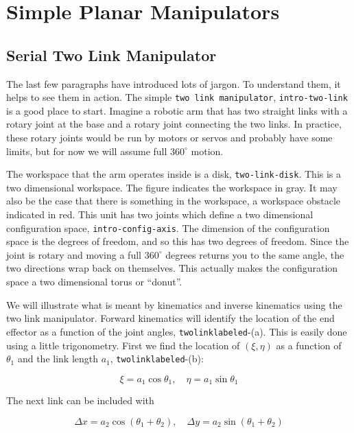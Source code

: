 \hypertarget{simple-planar-manipulators}{%
\section{Simple Planar Manipulators}\label{simple-planar-manipulators}}

\hypertarget{serial-two-link-manipulator}{%
\subsection{Serial Two Link
Manipulator}\label{serial-two-link-manipulator}}

The last few paragraphs have introduced lots of jargon. To understand
them, it helps to see them in action. The simple
\texttt{two\ link\ manipulator}, \texttt{intro-two-link} is a good place
to start. Imagine a robotic arm that has two straight links with a
rotary joint at the base and a rotary joint connecting the two links. In
practice, these rotary joints would be run by motors or servos and
probably have some limits, but for now we will assume full \(360^\circ\)
motion.

The workspace that the arm operates inside is a disk,
\texttt{two-link-disk}. This is a two dimensional workspace. The figure
indicates the workspace in gray. It may also be the case that there is
something in the workspace, a workspace obstacle indicated in red. This
unit has two joints which define a two dimensional configuration space,
\texttt{intro-config-axis}. The dimension of the configuration space is
the degrees of freedom, and so this has two degrees of freedom. Since
the joint is rotary and moving a full \(360^\circ\) degrees returns you
to the same angle, the two directions wrap back on themselves. This
actually makes the configuration space a two dimensional torus or
``donut''.

We will illustrate what is meant by kinematics and inverse kinematics
using the two link manipulator. Forward kinematics will identify the
location of the end effector as a function of the joint angles,
\texttt{twolinklabeled}-(a). This is easily done using a little
trigonometry. First we find the location of \((\xi, \eta)\) as a
function of \(\theta_1\) and the link length \(a_1\),
\texttt{twolinklabeled}-(b):

\[\xi =  a_1 \cos \theta_1, \quad \eta = a_1 \sin \theta_1\]

The next link can be included with

\[\Delta x =  a_2 \cos (\theta_1 + \theta_2), \quad \Delta y = a_2 \sin ( \theta_1 + \theta_2)\]

